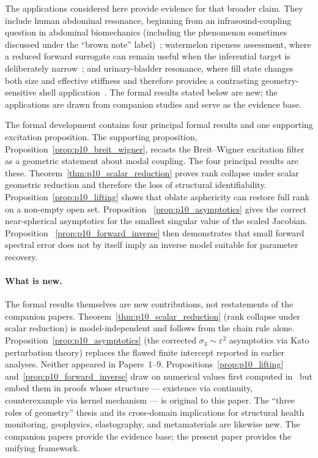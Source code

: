The applications considered here provide evidence for that broader claim.  They
include human abdominal resonance, beginning from an infrasound-coupling
question in abdominal biomechanics (including the phenomenon sometimes
discussed under the ``brown note'' label)~\cite{BrowntoneP1,BrowntoneP6};
watermelon ripeness assessment, where a reduced forward surrogate can remain
useful when the inferential target is deliberately narrow~\cite{BrowntoneP7};
and urinary-bladder resonance, where fill state changes both size and effective
stiffness and therefore provides a contrasting geometry-sensitive shell
application~\cite{BrowntoneP4}.  The formal results stated below are new; the
applications are drawn from companion studies and serve as the evidence base.

The formal development contains four principal formal results and one
supporting excitation proposition.  The supporting proposition,
Proposition~\ref{prop:p10_breit_wigner}, recasts the Breit--Wigner excitation
filter as a geometric statement about modal coupling.  The four principal
results are these.  Theorem~\ref{thm:p10_scalar_reduction} proves rank collapse
under scalar geometric reduction and therefore the loss of structural
identifiability.  Proposition~\ref{prop:p10_lifting} shows that oblate asphericity
can restore full rank on a non-empty open set.  Proposition
~\ref{prop:p10_asymptotics} gives the correct near-spherical asymptotics for
the smallest singular value of the scaled Jacobian.  Proposition
~\ref{prop:p10_forward_inverse} then demonstrates that small forward spectral
error does not by itself imply an inverse model suitable for parameter
recovery.

\paragraph{What is new.}
The formal results themselves are new contributions, not restatements of the
companion papers.  Theorem~\ref{thm:p10_scalar_reduction} (rank collapse under
scalar reduction) is model-independent and follows from the chain rule alone.
Proposition~\ref{prop:p10_asymptotics} (the corrected
$\sigma_3\sim\varepsilon^2$ asymptotics via Kato perturbation theory) replaces
the flawed finite intercept reported in earlier analyses.  Neither appeared in
Papers~1--9.  Propositions~\ref{prop:p10_lifting}
and~\ref{prop:p10_forward_inverse} draw on numerical values first computed
in~\cite{BrowntoneP8} but embed them in proofs whose structure --- existence
via continuity, counterexample via kernel mechanism --- is original to this
paper.  The ``three roles of geometry'' thesis and its cross-domain
implications for structural health monitoring, geophysics, elastography, and
metamaterials are likewise new.  The companion papers provide the evidence
base; the present paper provides the unifying framework.

